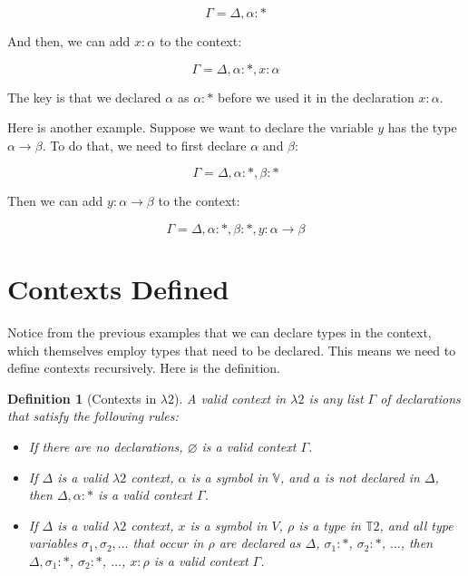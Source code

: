 \documentclass{book}
\numberwithin{equation}{chapter}
\newtheorem{definition}{Definition}
\begin{document}
\begin{equation}
\Gamma = \Delta, \alpha : *
\end{equation}

\noindent
And then, we can add $x : \alpha$ to the context:

\begin{equation}
\Gamma = \Delta, \alpha : *, x : \alpha
\end{equation}

\noindent
The key is that we declared $\alpha$ as $\alpha : *$ before we used it in the declaration $x: \alpha$.

Here is another example. Suppose we want to declare the variable $y$ has the type $\alpha \rightarrow \beta$. To do that, we need to first declare $\alpha$ and $\beta$:

\begin{equation}
\Gamma = \Delta, \alpha : *, \beta : *
\end{equation}

\noindent
Then we can add $y : \alpha \rightarrow \beta$ to the context:

\begin{equation}
\Gamma = \Delta, \alpha : *, \beta : *, y : \alpha \rightarrow \beta
\end{equation}


\section{Contexts Defined}

Notice from the previous examples that we can declare types in the context, which themselves employ types that need to be declared. This means we need to define contexts recursively. Here is the definition.

\begin{definition}[Contexts in $\lambda 2$]
A valid context in $\lambda 2$ is any list $\Gamma$ of declarations that satisfy the following rules:

\begin{itemize}
\item{If there are no declarations, $\varnothing$ is a valid context $\Gamma$.}
\item{If $\Delta$ is a valid $\lambda 2$ context, $\alpha$ is a symbol in $\mathbb{V}$, and $a$ is not declared in $\Delta$, then $\Delta, \alpha : *$ is a valid context $\Gamma$.}
\item{If $\Delta$ is a valid $\lambda 2$ context, $x$ is a symbol in $V$, $\rho$ is a type in $\mathbb{T}2$, and all type variables $\sigma_{1}, \sigma_{2}, \ldots$ that occur in $\rho$ are declared as $\Delta$, $\sigma_{1}: *$, $\sigma_{2}: *$, $\ldots$, then $\Delta, \sigma_{1}: *$, $\sigma_{2}: *$, $\ldots$, $x : \rho$ is a valid context $\Gamma$.}
\end{itemize}
\end{definition}
\end{document}

